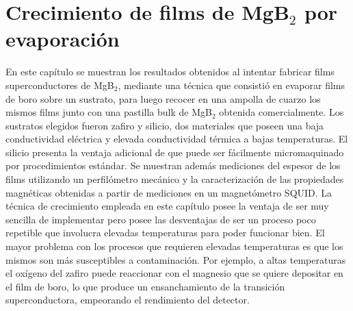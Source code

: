 \chapter{Crecimiento de films de MgB$_2$ por evaporación}\label{C:evap}
\graphicspath{{figs/evap/}}

En este capítulo se muestran los resultados obtenidos al intentar fabricar films superconductores de MgB$_{2}$, mediante una técnica que consistió en evaporar films de boro sobre un sustrato, para luego recocer en una ampolla de cuarzo los mismos films junto con una pastilla bulk de MgB$_{2}$ obtenida comercialmente. Los sustratos elegidos fueron zafiro y silicio, dos materiales que poseen una baja conductividad eléctrica y elevada conductividad térmica a bajas temperaturas. El silicio presenta la ventaja adicional de que puede ser fácilmente micromaquinado por procedimientos estándar. Se muestran además mediciones del espesor de los films utilizando un perfilómetro mecánico y la caracterización de las propiedades magnéticas obtenidas a partir de mediciones en un magnetómetro SQUID. La técnica de crecimiento empleada en este capítulo posee la ventaja de ser muy sencilla de implementar pero posee las desventajas de ser un proceso poco repetible que involucra elevadas temperaturas para poder funcionar bien. El mayor problema con los procesos que requieren elevadas temperaturas es que los mismos son más susceptibles a contaminación. Por ejemplo, a altas temperaturas el oxígeno del zafiro puede reaccionar con el magnesio que se quiere depositar en el film de boro, lo que produce un ensanchamiento de la transición superconductora, empeorando el rendimiento del detector.

